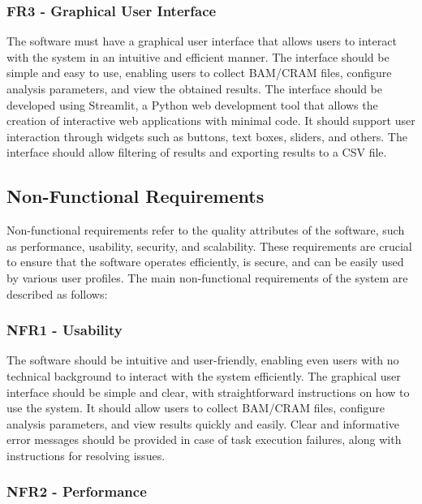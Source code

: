 \subsubsection{\textbf{FR3 - Graphical User Interface}}

The software must have a graphical user interface that allows users to interact with the system in an intuitive and efficient manner. The interface should be simple and easy to use, enabling users to collect BAM/CRAM files, configure analysis parameters, and view the obtained results. The interface should be developed using Streamlit, a Python web development tool that allows the creation of interactive web applications with minimal code. It should support user interaction through widgets such as buttons, text boxes, sliders, and others. The interface should allow filtering of results and exporting results to a CSV file.

\subsection{Non-Functional Requirements}

Non-functional requirements refer to the quality attributes of the software, such as performance, usability, security, and scalability. These requirements are crucial to ensure that the software operates efficiently, is secure, and can be easily used by various user profiles. \cite{Geeks2024} The main non-functional requirements of the system are described as follows:

\subsubsection{\textbf{NFR1 - Usability}}

The software should be intuitive and user-friendly, enabling even users with no technical background to interact with the system efficiently. The graphical user interface should be simple and clear, with straightforward instructions on how to use the system. It should allow users to collect BAM/CRAM files, configure analysis parameters, and view results quickly and easily. Clear and informative error messages should be provided in case of task execution failures, along with instructions for resolving issues.

\subsubsection{\textbf{NFR2 - Performance}}

